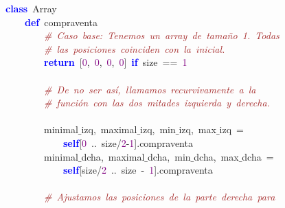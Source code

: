 \noindent
\mbox{}\textbf{\textcolor{Blue}{class}}\ Array \\
\mbox{}\ \ \ \ \textbf{\textcolor{Blue}{def}}\ compraventa \\
\mbox{}\ \ \ \ \ \ \ \ \textit{\textcolor{Brown}{\#\ Caso\ base:\ Tenemos\ un\ array\ de\ tamaño\ 1.\ Todas\ }} \\
\mbox{}\ \ \ \ \ \ \ \ \textit{\textcolor{Brown}{\#\ las\ posiciones\ coinciden\ con\ la\ inicial.\ }} \\
\mbox{}\ \ \ \ \ \ \ \ \textbf{\textcolor{Blue}{return}}\ \textcolor{BrickRed}{[}\textcolor{Purple}{0}\textcolor{BrickRed}{,}\ \textcolor{Purple}{0}\textcolor{BrickRed}{,}\ \textcolor{Purple}{0}\textcolor{BrickRed}{,}\ \textcolor{Purple}{0}\textcolor{BrickRed}{]}\ \textbf{\textcolor{Blue}{if}}\ size\ \textcolor{BrickRed}{==}\ \textcolor{Purple}{1}\ \ \ \ \ \ \ \ \ \ \ \ \  \\
\mbox{} \\
\mbox{}\ \ \ \ \ \ \ \ \textit{\textcolor{Brown}{\#\ De\ no\ ser\ así,\ llamamos\ recurvivamente\ a\ la\ }} \\
\mbox{}\ \ \ \ \ \ \ \ \textit{\textcolor{Brown}{\#\ función\ con\ las\ dos\ mitades\ izquierda\ y\ derecha.\ \ \ \ \ }} \\
\mbox{} \\
\mbox{}\ \ \ \ \ \ \ \ minimal$\_$izq\textcolor{BrickRed}{,}\ maximal$\_$izq\textcolor{BrickRed}{,}\ min$\_$izq\textcolor{BrickRed}{,}\ max$\_$izq\ \textcolor{BrickRed}{=}\  \\
\mbox{}\ \ \ \ \ \ \ \ \ \ \ \ \textbf{\textcolor{Blue}{self}}\textcolor{BrickRed}{[}\textcolor{Purple}{0}\ \textcolor{BrickRed}{..}\ size\textcolor{BrickRed}{/}\textcolor{Purple}{2}\textcolor{BrickRed}{-}\textcolor{Purple}{1}\textcolor{BrickRed}{].}compraventa\  \\
\mbox{}\ \ \ \ \ \ \ \ minimal$\_$dcha\textcolor{BrickRed}{,}\ maximal$\_$dcha\textcolor{BrickRed}{,}\ min$\_$dcha\textcolor{BrickRed}{,}\ max$\_$dcha\ \textcolor{BrickRed}{=}\  \\
\mbox{}\ \ \ \ \ \ \ \ \ \ \ \ \textbf{\textcolor{Blue}{self}}\textcolor{BrickRed}{[}size\textcolor{BrickRed}{/}\textcolor{Purple}{2}\ \textcolor{BrickRed}{..}\ size\ \textcolor{BrickRed}{-}\ \textcolor{Purple}{1}\textcolor{BrickRed}{].}compraventa \\
\mbox{} \\
\mbox{}\ \ \ \ \ \ \ \ \textit{\textcolor{Brown}{\#\ Ajustamos\ las\ posiciones\ de\ la\ parte\ derecha\ para}} \\
